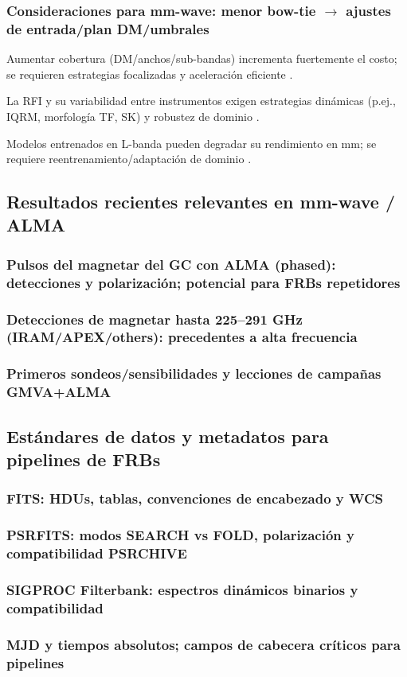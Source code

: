 \subsubsection{Consideraciones para mm-wave: menor bow-tie $\rightarrow$ ajustes de entrada/plan DM/umbrales}

Aumentar cobertura (DM/anchos/sub-bandas) incrementa fuertemente el costo; se requieren estrategias 
focalizadas y aceleración eficiente \citep{zhang2024drafts,Zackay_2014_FDMT}.

La RFI y su variabilidad entre instrumentos exigen estrategias dinámicas 
(p.ej., IQRM, morfología TF, SK) y robustez de dominio 
\citep{Morello_2021_IQRM,Offringa2010,Offringa2012}.

Modelos entrenados en L-banda pueden degradar su rendimiento en mm; 
se requiere reentrenamiento/adaptación de dominio \citep{zhang2024drafts}.

\subsection{Resultados recientes relevantes en mm-wave / ALMA}

\subsubsection{Pulsos del magnetar del GC con ALMA (phased): detecciones y polarización; potencial para FRBs repetidores}

\subsubsection{Detecciones de magnetar hasta 225--291 GHz (IRAM/APEX/others): precedentes a alta frecuencia}

\subsubsection{Primeros sondeos/sensibilidades y lecciones de campañas GMVA+ALMA}

\subsection{Estándares de datos y metadatos para pipelines de FRBs}

\subsubsection{FITS: HDUs, tablas, convenciones de encabezado y WCS}

\subsubsection{PSRFITS: modos SEARCH vs FOLD, polarización y compatibilidad PSRCHIVE}

\subsubsection{SIGPROC Filterbank: espectros dinámicos binarios y compatibilidad}

\subsubsection{MJD y tiempos absolutos; campos de cabecera críticos para pipelines}

